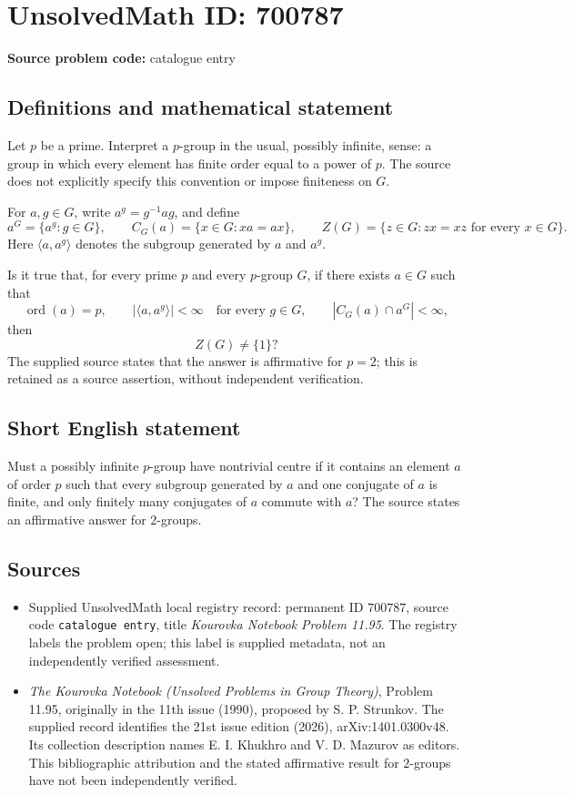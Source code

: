\documentclass[11pt]{article}
\begin{document}
\section*{UnsolvedMath ID: 700787}
\textbf{Source problem code:} catalogue entry
\subsection{Definitions and mathematical statement}
Let \(p\) be a prime. Interpret a \(p\)-group in the usual, possibly infinite, sense: a group in which every element has finite order equal to a power of \(p\). The source does not explicitly specify this convention or impose finiteness on \(G\).

For \(a,g\in G\), write \(a^g=g^{-1}ag\), and define
\[
 a^G=\{a^g:g\in G\},\qquad
 C_G(a)=\{x\in G:xa=ax\},\qquad
 Z(G)=\{z\in G:zx=xz\text{ for every }x\in G\}.
\]
Here \(\langle a,a^g\rangle\) denotes the subgroup generated by \(a\) and \(a^g\).

Is it true that, for every prime \(p\) and every \(p\)-group \(G\), if there exists \(a\in G\) such that
\[
 \operatorname{ord}(a)=p,\qquad
 \bigl|\langle a,a^g\rangle\bigr|<\infty\quad\text{for every }g\in G,
 \qquad
 |C_G(a)\cap a^G|<\infty,
\]
then
\[
 Z(G)\ne\{1\}?
\]
The supplied source states that the answer is affirmative for \(p=2\); this is retained as a source assertion, without independent verification.
\subsection{Short English statement}
Must a possibly infinite \(p\)-group have nontrivial centre if it contains an element \(a\) of order \(p\) such that every subgroup generated by \(a\) and one conjugate of \(a\) is finite, and only finitely many conjugates of \(a\) commute with \(a\)? The source states an affirmative answer for \(2\)-groups.
\subsection{Sources}
\begin{itemize}
\item Supplied UnsolvedMath local registry record: permanent ID \(700787\), source code \texttt{catalogue entry}, title \emph{Kourovka Notebook Problem 11.95}. The registry labels the problem open; this label is supplied metadata, not an independently verified assessment.
\item \emph{The Kourovka Notebook (Unsolved Problems in Group Theory)}, Problem 11.95, originally in the 11th issue (1990), proposed by S. P. Strunkov. The supplied record identifies the 21st issue edition (2026), arXiv:1401.0300v48. Its collection description names E. I. Khukhro and V. D. Mazurov as editors. This bibliographic attribution and the stated affirmative result for \(2\)-groups have not been independently verified.
\end{itemize}
\end{document}
